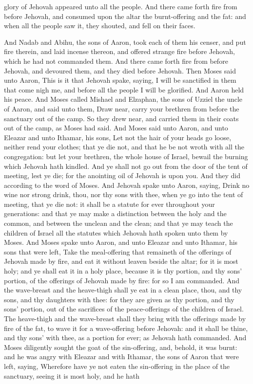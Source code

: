 glory of Jehovah appeared unto all the people. And there came forth fire from before Jehovah, and consumed upon the altar the burnt-offering and the fat: and when all the people saw it, they shouted, and fell on their faces. 

And Nadab and Abihu, the sons of Aaron, took each of them his censer, and put fire therein, and laid incense thereon, and offered strange fire before Jehovah, which he had not commanded them. And there came forth fire from before Jehovah, and devoured them, and they died before Jehovah. Then Moses said unto Aaron, This is it that Jehovah spake, saying, I will be sanctified in them that come nigh me, and before all the people I will be glorified. And Aaron held his peace. And Moses called Mishael and Elzaphan, the sons of Uzziel the uncle of Aaron, and said unto them, Draw near, carry your brethren from before the sanctuary out of the camp. So they drew near, and carried them in their coats out of the camp, as Moses had said. And Moses said unto Aaron, and unto Eleazar and unto Ithamar, his sons, Let not the hair of your heads go loose, neither rend your clothes; that ye die not, and that he be not wroth with all the congregation: but let your brethren, the whole house of Israel, bewail the burning which Jehovah hath kindled. And ye shall not go out from the door of the tent of meeting, lest ye die; for the anointing oil of Jehovah is upon you. And they did according to the word of Moses.  And Jehovah spake unto Aaron, saying, Drink no wine nor strong drink, thou, nor thy sons with thee, when ye go into the tent of meeting, that ye die not: it shall be a statute for ever throughout your generations: and that ye may make a distinction between the holy and the common, and between the unclean and the clean; and that ye may teach the children of Israel all the statutes which Jehovah hath spoken unto them by Moses.  And Moses spake unto Aaron, and unto Eleazar and unto Ithamar, his sons that were left, Take the meal-offering that remaineth of the offerings of Jehovah made by fire, and eat it without leaven beside the altar; for it is most holy; and ye shall eat it in a holy place, because it is thy portion, and thy sons’ portion, of the offerings of Jehovah made by fire: for so I am commanded. And the wave-breast and the heave-thigh shall ye eat in a clean place, thou, and thy sons, and thy daughters with thee: for they are given as thy portion, and thy sons’ portion, out of the sacrifices of the peace-offerings of the children of Israel. The heave-thigh and the wave-breast shall they bring with the offerings made by fire of the fat, to wave it for a wave-offering before Jehovah: and it shall be thine, and thy sons’ with thee, as a portion for ever; as Jehovah hath commanded.  And Moses diligently sought the goat of the sin-offering, and, behold, it was burnt: and he was angry with Eleazar and with Ithamar, the sons of Aaron that were left, saying, Wherefore have ye not eaten the sin-offering in the place of the sanctuary, seeing it is most holy, and he hath 